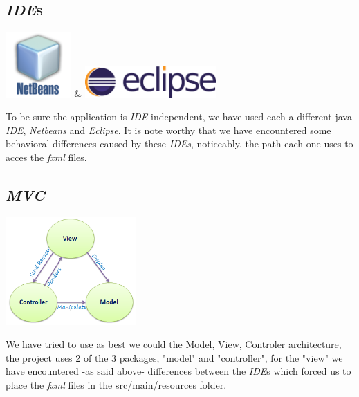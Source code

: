 \documentclass[11pt]{article}
\begin{document}
\subsection{\textit{IDE}s}
\begin{center}
\includegraphics[width=2.5cm]{./img/netBeans.png} \& \includegraphics[width=5cm]{./img/eclipse.png}
\end{center}
To be sure the application is \textit{IDE}-independent, we have used each a different java \textit{IDE}, \textit{Netbeans} and \textit{Eclipse}. It is note worthy that we have encountered some behavioral differences caused by these \textit{IDEs}, noticeably, the path each one uses to acces the \textit{fxml} files.
\subsection{\textit{MVC}}
\begin{center}
\includegraphics[width=5cm]{./img/mvc.png}
\end{center}
We have tried to use as best we could the Model, View, Controler architecture, the project uses 2 of the 3 packages, "model" and "controller", for the "view" we have encountered -as said above- differences between the \textit{IDE}s which forced us to place the \textit{fxml} files in the src/main/resources folder.
\end{document}
